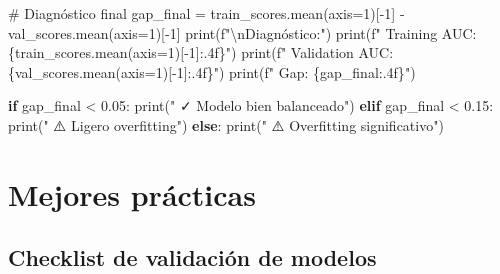 \documentclass[
  doc,
  floatsintext,
  longtable,
  a4paper,
  nolmodern,
  notxfonts,
  notimes,
  12pt,
  colorlinks=true,linkcolor=blue,citecolor=blue,urlcolor=blue]{apa7}
\newenvironment{Shaded}{\begin{snugshade}}{\end{snugshade}}
\newcommand{\BuiltInTok}[1]{\textcolor[rgb]{0.00,0.23,0.31}{#1}}
\newcommand{\CharTok}[1]{\textcolor[rgb]{0.13,0.47,0.30}{#1}}
\newcommand{\CommentTok}[1]{\textcolor[rgb]{0.37,0.37,0.37}{#1}}
\newcommand{\ControlFlowTok}[1]{\textcolor[rgb]{0.00,0.23,0.31}{\textbf{#1}}}
\newcommand{\DecValTok}[1]{\textcolor[rgb]{0.68,0.00,0.00}{#1}}
\newcommand{\FloatTok}[1]{\textcolor[rgb]{0.68,0.00,0.00}{#1}}
\newcommand{\NormalTok}[1]{\textcolor[rgb]{0.00,0.23,0.31}{#1}}
\newcommand{\OperatorTok}[1]{\textcolor[rgb]{0.37,0.37,0.37}{#1}}
\newcommand{\SpecialCharTok}[1]{\textcolor[rgb]{0.37,0.37,0.37}{#1}}
\newcommand{\SpecialStringTok}[1]{\textcolor[rgb]{0.13,0.47,0.30}{#1}}
\newcommand{\StringTok}[1]{\textcolor[rgb]{0.13,0.47,0.30}{#1}}
\begin{document}
\begin{Shaded}
\begin{Highlighting}[]
\CommentTok{\# Diagnóstico final}
\NormalTok{gap\_final }\OperatorTok{=}\NormalTok{ train\_scores.mean(axis}\OperatorTok{=}\DecValTok{1}\NormalTok{)[}\OperatorTok{{-}}\DecValTok{1}\NormalTok{] }\OperatorTok{{-}}\NormalTok{ val\_scores.mean(axis}\OperatorTok{=}\DecValTok{1}\NormalTok{)[}\OperatorTok{{-}}\DecValTok{1}\NormalTok{]}
\BuiltInTok{print}\NormalTok{(}\SpecialStringTok{f"}\CharTok{\textbackslash{}n}\SpecialStringTok{Diagnóstico:"}\NormalTok{)}
\BuiltInTok{print}\NormalTok{(}\SpecialStringTok{f"  Training AUC: }\SpecialCharTok{\{}\NormalTok{train\_scores}\SpecialCharTok{.}\NormalTok{mean(axis}\OperatorTok{=}\DecValTok{1}\NormalTok{)[}\OperatorTok{{-}}\DecValTok{1}\NormalTok{]}\SpecialCharTok{:.4f\}}\SpecialStringTok{"}\NormalTok{)}
\BuiltInTok{print}\NormalTok{(}\SpecialStringTok{f"  Validation AUC: }\SpecialCharTok{\{}\NormalTok{val\_scores}\SpecialCharTok{.}\NormalTok{mean(axis}\OperatorTok{=}\DecValTok{1}\NormalTok{)[}\OperatorTok{{-}}\DecValTok{1}\NormalTok{]}\SpecialCharTok{:.4f\}}\SpecialStringTok{"}\NormalTok{)}
\BuiltInTok{print}\NormalTok{(}\SpecialStringTok{f"  Gap: }\SpecialCharTok{\{}\NormalTok{gap\_final}\SpecialCharTok{:.4f\}}\SpecialStringTok{"}\NormalTok{)}

\ControlFlowTok{if}\NormalTok{ gap\_final }\OperatorTok{\textless{}} \FloatTok{0.05}\NormalTok{:}
    \BuiltInTok{print}\NormalTok{(}\StringTok{"  ✓ Modelo bien balanceado"}\NormalTok{)}
\ControlFlowTok{elif}\NormalTok{ gap\_final }\OperatorTok{\textless{}} \FloatTok{0.15}\NormalTok{:}
    \BuiltInTok{print}\NormalTok{(}\StringTok{"  ⚠️  Ligero overfitting"}\NormalTok{)}
\ControlFlowTok{else}\NormalTok{:}
    \BuiltInTok{print}\NormalTok{(}\StringTok{"  ⚠️  Overfitting significativo"}\NormalTok{)}
\end{Highlighting}
\end{Shaded}

\section{Mejores prácticas}\label{mejores-pruxe1cticas}

\subsection{Checklist de validación de
modelos}\label{checklist-de-validaciuxf3n-de-modelos}
\end{document}
